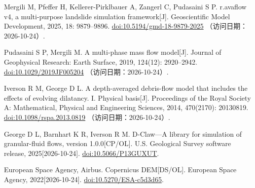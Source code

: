Mergili M, Pfeffer H, Kellerer-Pirklbauer A, Zangerl C, Pudasaini S P.
r.avaflow v4, a multi-purpose landslide simulation framework[J].
Geoscientific Model Development, 2025, 18: 9879--9896.
\href{https://doi.org/10.5194/gmd-18-9879-2025}{doi:10.5194/gmd-18-9879-2025}
（访问日期：2026-10-24）.

Pudasaini S P, Mergili M.
A multi-phase mass flow model[J].
Journal of Geophysical Research: Earth Surface, 2019, 124(12): 2920--2942.
\href{https://doi.org/10.1029/2019JF005204}{doi:10.1029/2019JF005204}
（访问日期：2026-10-24）.

Iverson R M, George D L.
A depth-averaged debris-flow model that includes the effects of evolving dilatancy. I. Physical basis[J].
Proceedings of the Royal Society A: Mathematical, Physical and Engineering Sciences,
2014, 470(2170): 20130819.
\href{https://doi.org/10.1098/rspa.2013.0819}{doi:10.1098/rspa.2013.0819}
（访问日期：2026-10-24）.

George D L, Barnhart K R, Iverson R M.
D-Claw---A library for simulation of granular-fluid flows, version 1.0.0[CP/OL].
U.S. Geological Survey software release, 2025[2026-10-24].
\href{https://doi.org/10.5066/P13GUXUT}{doi:10.5066/P13GUXUT}.

European Space Agency, Airbus.
Copernicus DEM[DS/OL].
European Space Agency, 2022[2026-10-24].
\href{https://doi.org/10.5270/ESA-c5d3d65}{doi:10.5270/ESA-c5d3d65}.
